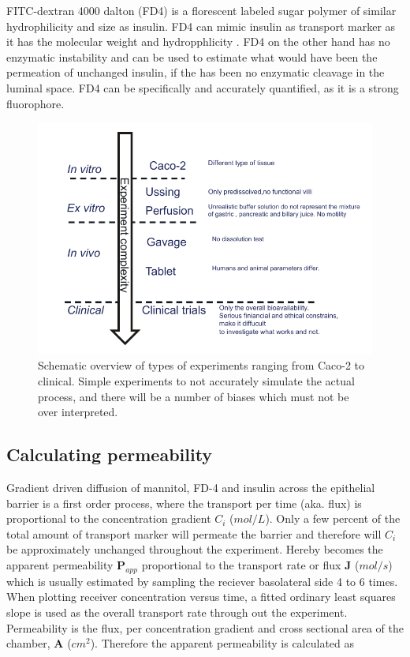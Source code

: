 FITC-dextran 4000 dalton (FD4) is a florescent labeled sugar polymer of similar hydrophilicity and size as insulin. FD4 can mimic insulin as transport marker as it has the molecular weight and hydropphlicity \cite{vernon1999insulin}. FD4 on the other hand has no enzymatic instability and can be used to estimate what would have been the permeation of unchanged insulin, if the has been no enzymatic cleavage in the luminal space. FD4 can be specifically and accurately quantified, as it is a strong fluorophore.

\begin{figure}[!htpb]

\includegraphics{graphics/typeOfExperiments.pdf}
\caption{Schematic overview of types of experiments ranging from Caco-2 to clinical. Simple experiments to not accurately simulate the actual process, and there will be a number of biases which must not be over interpreted.}
\label{devel_typeOf}
\end{figure}

\subsection{Calculating permeability}
Gradient driven diffusion of mannitol, FD-4 and insulin across the epithelial barrier is a first order process, where the transport per time (aka. flux) is proportional to the concentration gradient $C_i$ ($mol/L$). Only a few percent of the total amount of transport marker will permeate the barrier and therefore will $C_i$ be approximately unchanged throughout the experiment. Hereby becomes the apparent permeability $\bm{P}_{app}$ proportional to the transport rate or flux $\bm{J}$ ($mol/s$) which is usually estimated by sampling the reciever basolateral side 4 to 6 times. When plotting receiver concentration versus time, a fitted ordinary least squares slope is used as the overall transport rate through out the experiment. Permeability is the flux, per concentration gradient and cross sectional area of the chamber, $\bm{A}$ ($cm^2$). Therefore the apparent permeability is calculated as

